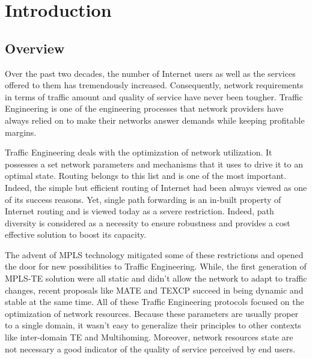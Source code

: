 \chapter{Introduction}
\label{chapter:intro}

\section{Overview} %
Over the past two decades, the number of Internet users as well as the services offered to them has tremendously increased. Consequently, network requirements in terms of traffic amount and quality of service have never been tougher. Traffic Engineering is one of the engineering processes that network providers have always relied on to make their networks answer demands while keeping profitable margins. 

Traffic Engineering deals with the optimization of network utilization. It possesses a set network parameters and mechanisms that it uses to drive it to an optimal state. Routing belongs to this list and is one of the most important. Indeed, the simple but efficient routing of Internet had been always viewed as one of its success reasons. Yet, single path forwarding is an in-built property of Internet routing and is viewed today as a severe restriction. Indeed, path diversity is considered as a necessity to ensure robustness and provides a cost effective solution to boost its capacity.

The advent of MPLS technology mitigated some of these restrictions and opened the door for new possibilities to Traffic Engineering. While, the first generation of MPLS-TE solution were all static and didn't allow the network to adapt to traffic changes, recent proposals like MATE and TEXCP succeed in being dynamic and stable at the same time. All of these Traffic Engineering protocols focused on the optimization of network resources. Because these parameters are usually proper to a single domain, it wasn't easy to generalize their principles to other contexts like inter-domain TE and Multihoming. Moreover, network resources state are not necessary a good indicator of the quality of service perceived by end users.

